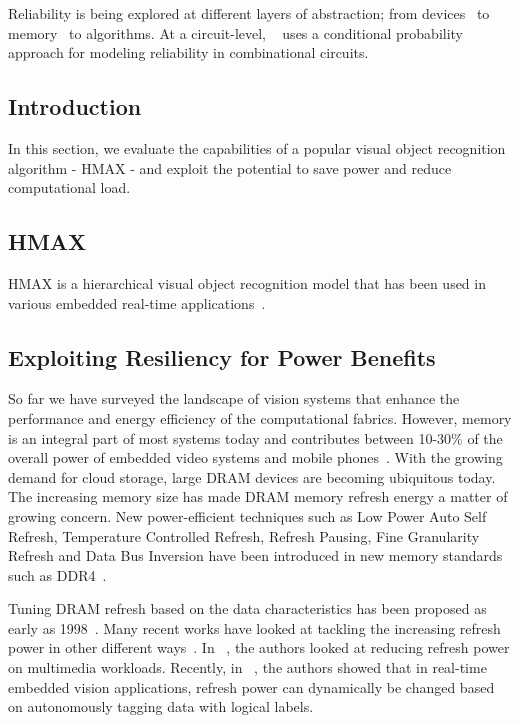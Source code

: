 Reliability is being explored at different layers of abstraction; from devices~\cite{Datta2014,Datta2015,Rahul2015} to memory~\cite{isca2014} to algorithms.
At a circuit-level, ~\cite{chen2015fast} uses a conditional probability approach for modeling reliability in combinational circuits.

\subsection{Introduction}
In this section, we evaluate the capabilities of a popular visual object recognition algorithm - HMAX - and exploit the potential to save 
power and reduce computational load.

\subsection{HMAX}
HMAX is a hierarchical visual object recognition model that has been used in various embedded real-time applications~\cite{Kestur2012, Maashri2012a}. 


\subsection{Exploiting Resiliency for Power Benefits}

So far we have surveyed the landscape of vision systems that enhance the 
performance and energy efficiency of the computational fabrics. 
However, memory is an integral part of most systems today and contributes 
between 10-30\% of the overall power of embedded video systems and 
mobile phones~\cite{CarrollAaronHeiser2010}. With the growing demand for cloud storage, large DRAM devices are becoming ubiquitous today. The increasing memory 
size has made DRAM memory refresh energy a matter of growing concern. 
New power-efficient techniques such as Low Power Auto Self Refresh, Temperature Controlled Refresh, Refresh Pausing, Fine Granularity Refresh and Data Bus 
Inversion have been introduced in new memory standards such as DDR4~\cite{jedec-sdram-standards}.  

Tuning DRAM refresh based on the data characteristics has been proposed as early as 1998~\cite{islped98}.  
Many recent works have looked at tackling the increasing refresh power in other 
different ways~\cite{Liu2012, Stuecheli2010}. In ~\cite{Liu2011}, the 
authors looked at reducing refresh power on multimedia workloads. Recently, in ~\cite{iccd2014}, the authors showed that in 
real-time embedded vision applications, refresh power can dynamically be changed based on autonomously tagging data with logical labels.

